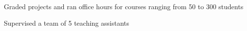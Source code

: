 \begin{cventries}
{\begin{cvitems}
        \item {Graded projects and ran office hours for courses ranging from 50 to 300 students}
        \item {Supervised a team of 5 teaching assistants}
      \end{cvitems}
    }

\end{cventries}

